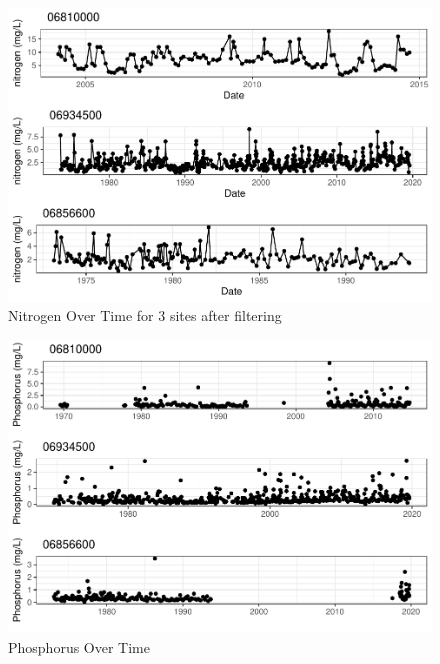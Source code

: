 \documentclass[12pt,]{article}
\begin{document}
\begin{figure}
\centering
\includegraphics{Project_Template_files/figure-latex/N.t3-1.pdf}
\caption{\label{fig:N.t3}Nitrogen Over Time for 3 sites after filtering}
\end{figure}

\begin{figure}
\centering
\includegraphics{Project_Template_files/figure-latex/P.t-1.pdf}
\caption{\label{fig:P.t}Phosphorus Over Time}
\end{figure}
\end{document}
